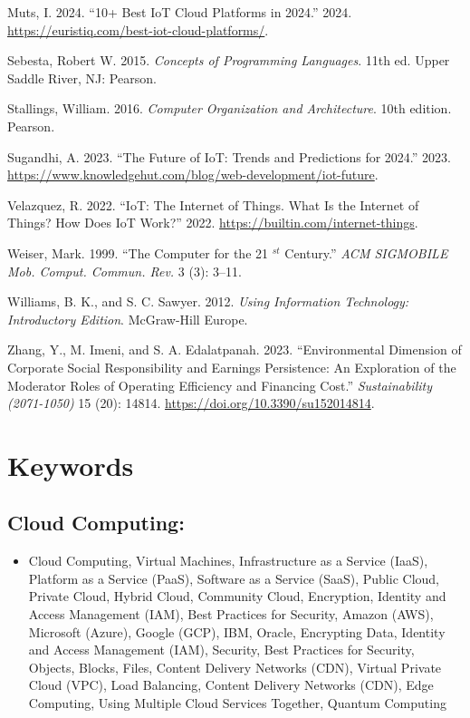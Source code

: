 \documentclass[
  letterpaper,
  DIV=11,
  numbers=noendperiod]{scrreprt}
\providecommand{\tightlist}{%
  \setlength{\itemsep}{0pt}\setlength{\parskip}{0pt}}\usepackage{longtable,booktabs,array}
\newlength{\cslhangindent}
\newenvironment{CSLReferences}[2] %
 {\begin{list}{}{%
  \setlength{\itemindent}{0pt}
  \setlength{\leftmargin}{0pt}
  \setlength{\parsep}{0pt}
  \ifodd #1
   \setlength{\leftmargin}{\cslhangindent}
   \setlength{\itemindent}{-1\cslhangindent}
  \fi
  \setlength{\itemsep}{#2\baselineskip}}}
 {\end{list}}
\begin{document}
\begin{CSLReferences}{1}{0}
Muts, I. 2024. {``10+ Best IoT Cloud Platforms in 2024.''} 2024.
\url{https://euristiq.com/best-iot-cloud-platforms/}.

Sebesta, Robert W. 2015. \emph{Concepts of Programming Languages}. 11th
ed. Upper Saddle River, NJ: Pearson.

Stallings, William. 2016. \emph{Computer Organization and Architecture}.
10th edition. Pearson.

Sugandhi, A. 2023. {``The Future of IoT: Trends and Predictions for
2024.''} 2023.
\url{https://www.knowledgehut.com/blog/web-development/iot-future}.

Velazquez, R. 2022. {``IoT: The Internet of Things. What Is the Internet
of Things? How Does IoT Work?''} 2022.
\url{https://builtin.com/internet-things}.

Weiser, Mark. 1999. {``The Computer for the 21 \(^{st}\) Century.''}
\emph{ACM SIGMOBILE Mob. Comput. Commun. Rev.} 3 (3): 3--11.

Williams, B. K., and S. C. Sawyer. 2012. \emph{Using Information
Technology: Introductory Edition}. McGraw-Hill Europe.

Zhang, Y., M. Imeni, and S. A. Edalatpanah. 2023. {``Environmental
Dimension of Corporate Social Responsibility and Earnings Persistence:
An Exploration of the Moderator Roles of Operating Efficiency and
Financing Cost.''} \emph{Sustainability (2071-1050)} 15 (20): 14814.
\url{https://doi.org/10.3390/su152014814}.

\end{CSLReferences}

\section{Keywords}\label{keywords-1}

\subsection{Cloud Computing:}\label{cloud-computing-3}

\begin{itemize}
\tightlist
\item
  Cloud Computing, Virtual Machines, Infrastructure as a Service (IaaS),
  Platform as a Service (PaaS), Software as a Service (SaaS), Public
  Cloud, Private Cloud, Hybrid Cloud, Community Cloud, Encryption,
  Identity and Access Management (IAM), Best Practices for Security,
  Amazon (AWS), Microsoft (Azure), Google (GCP), IBM, Oracle, Encrypting
  Data, Identity and Access Management (IAM), Security, Best Practices
  for Security, Objects, Blocks, Files, Content Delivery Networks (CDN),
  Virtual Private Cloud (VPC), Load Balancing, Content Delivery Networks
  (CDN), Edge Computing, Using Multiple Cloud Services Together, Quantum
  Computing
\end{itemize}
\end{document}
